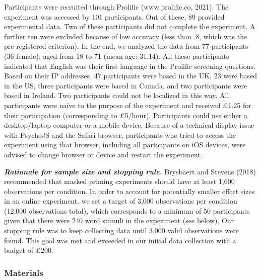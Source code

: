 \documentclass[
  english,
  man,floatsintext]{apa6}
\begin{document}
Participants were recruited through Prolific (www.prolific.co, 2021). The experiment was accessed by 101 participants. Out of these, 89 provided experimental data. Two of these participants did not complete the experiment. A further ten were excluded because of low accuracy (less than .8, which was the pre-registered criterion). In the end, we analyzed the data from 77 participants (36 female), aged from 18 to 71 (mean age: 31.14). All these participants indicated that English was their first language in the Prolific screening questions. Based on their IP addresses, 47 participants were based in the UK, 23 were based in the US, three participants were based in Canada, and two participants were based in Ireland. Two participants could not be localized in this way. All participants were naïve to the purpose of the experiment and received £1.25 for their participation (corresponding to £5/hour). Participants could use either a desktop/laptop computer or a mobile device. Because of a technical display issue with PsychoJS and the Safari browser, participants who tried to access the experiment using that browser, including all participants on iOS devices, were advised to change browser or device and restart the experiment.

\textbf{\emph{Rationale for sample size and stopping rule.}} Brysbaert and Stevens (2018) recommended that masked priming experiments should have at least 1,600 observations per condition. In order to account for potentially smaller effect sizes in an online experiment, we set a target of 3,000 observations per condition (12,000 observations total), which corresponds to a minimum of 50 participants given that there were 240 word stimuli in the experiment (see below). Our stopping rule was to keep collecting data until 3,000 valid observations were found. This goal was met and exceeded in our initial data collection with a budget of £200.

\hypertarget{materials}{%
\subsubsection{Materials}\label{materials}}
\end{document}
